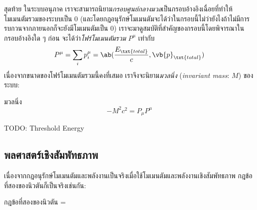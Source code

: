 สุดท้าย ในระบบอนุภาค เราจะสามารถนิยาม\emph{กรอบศูนย์กลางมวล}เป็นกรอบอ้างอิงเฉื่อยที่ทำให้โมเมนตัมรวมของระบบเป็น $0$ (และโดยกฎอนุรักษ์โมเมนตัมจะได้ว่าในกรอบนี้ไม่ว่ายังไงถ้าไม่มีการรบกวนจากภายนอกก็จะยังมีโมเมนตัมเป็น $0$) เราจะมาดูสมบัติที่สำคัญของกรอบนี้โดยพิจารณาในกรอบอ้างอิงใด ๆ ก่อน จะได้ว่า\emph{โฟร์โมเมนตัมรวม} $P^\mu$ เท่ากับ
\[
P^\mu = \sum_i p_i^\mu = \ab(\frac{E_\txt{total}}{c}, \vb{p}_\txt{total})
\]
เนื่องจากขนาดของโฟร์โมเมนตัมรวมนี้คงที่เสมอ เราจึงจะนิยาม\emph{มวลนิ่ง} (\emph{invariant mass}: $M$) ของระบบ:
\begin{defbox}{มวลนิ่ง}
    \begin{equation*}
        -M^2c^2 = P_\mu P^\mu
    \end{equation*}
\end{defbox}

TODO: Threshold Energy

\subsection{พลศาสตร์เชิงสัมพัทธภาพ}

เนื่องจากกฎอนุรักษ์โมเมนตัมและพลังงานเป็นจริงเมื่อใช้โมเมนตัมและพลังงานเชิงสัมพัทธภาพ กฎข้อที่สองของนิวตันก็เป็นจริงเช่นกัน:
\begin{ieqbox}{กฎข้อที่สองของนิวตัน}
     = 
\end{ieqbox}